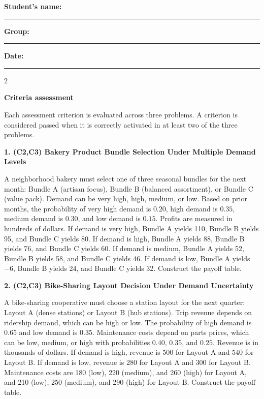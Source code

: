 \documentclass[12pt]{article}
\newcommand{\SubsectionBox}[1]{%
	\noindent\colorbox{gray!30}{%
		\parbox{\linewidth}{\textbf{#1}}%
	}\par\vspace{0.35cm}%
}
\begin{document}
	\vspace{0.4cm}

	\noindent
	\textbf{Student’s name:} \rule{7cm}{0.4pt}\hfill
	\textbf{Group:} \rule{2cm}{0.4pt}\hfill
	\textbf{Date:} \rule{3cm}{0.4pt}


	\begin{multicols}{2}
		\SubsectionBox{Criteria assessment}\vspace{-0.25cm}
		Each assessment criterion is evaluated across three problems. A criterion is considered passed when it is correctly activated in at least two of the three problems.

		\vspace{0.25cm}
		\SubsectionBox{1. (C2,C3) Bakery Product Bundle Selection Under Multiple Demand Levels}\vspace{-0.25cm}
		A neighborhood bakery must select one of three seasonal bundles for the next month: Bundle A (artisan focus),
		Bundle B (balanced assortment), or Bundle C (value pack). Demand can be very high, high, medium, or low.
		Based on prior months, the probability of very high demand is $0.20$, high demand is $0.35$, medium demand is $0.30$,
		and low demand is $0.15$. Profits are measured in hundreds of dollars. If demand is very high, Bundle A yields 110,
		Bundle B yields 95, and Bundle C yields 80. If demand is high, Bundle A yields 88, Bundle B yields 76, and Bundle C yields 60.
		If demand is medium, Bundle A yields 52, Bundle B yields 58, and Bundle C yields 46. If demand is low, Bundle A yields $-6$,
		Bundle B yields 24, and Bundle C yields 32. Construct the payoff table.

		\vspace{0.25cm}
		\SubsectionBox{2. (C2,C3) Bike-Sharing Layout Decision Under Demand Uncertainty}\vspace{-0.25cm}
		A bike-sharing cooperative must choose a station layout for the next quarter: Layout A (dense stations)
		or Layout B (hub stations). Trip revenue depends on ridership demand, which can be high or low.
		The probability of high demand is $0.65$ and low demand is $0.35$. Maintenance costs depend on parts prices,
		which can be low, medium, or high with probabilities $0.40$, $0.35$, and $0.25$. Revenue is in thousands of dollars.
		If demand is high, revenue is 500 for Layout A and 540 for Layout B. If demand is low, revenue is 280 for Layout A
		and 300 for Layout B. Maintenance costs are 180 (low), 220 (medium), and 260 (high) for Layout A, and 210 (low),
		250 (medium), and 290 (high) for Layout B. Construct the payoff table.


\end{multicols}
\end{document}
